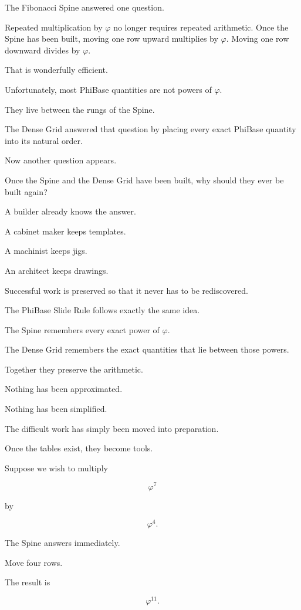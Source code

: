 \label{stone:sliderule}

The Fibonacci Spine answered one question.

Repeated multiplication by \(\varphi\) no longer requires repeated arithmetic. Once the Spine has been built, moving one row upward multiplies by \(\varphi\). Moving one row downward divides by \(\varphi\).

That is wonderfully efficient.

Unfortunately, most PhiBase quantities are not powers of \(\varphi\).

They live between the rungs of the Spine.

The Dense Grid answered that question by placing every exact PhiBase quantity into its natural order.

Now another question appears.

Once the Spine and the Dense Grid have been built, why should they ever be built again?

A builder already knows the answer.

A cabinet maker keeps templates.

A machinist keeps jigs.

An architect keeps drawings.

Successful work is preserved so that it never has to be rediscovered.

The PhiBase Slide Rule follows exactly the same idea.

The Spine remembers every exact power of \(\varphi\).

The Dense Grid remembers the exact quantities that lie between those powers.

Together they preserve the arithmetic.

Nothing has been approximated.

Nothing has been simplified.

The difficult work has simply been moved into preparation.

Once the tables exist, they become tools.

Suppose we wish to multiply

\[
\varphi^{7}
\]

by

\[
\varphi^{4}.
\]

The Spine answers immediately.

Move four rows.

The result is

\[
\varphi^{11}.
\]

